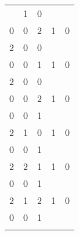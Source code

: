 \documentclass[11pt]{article} \usepackage{amssymb}
\begin{document}
\begin{enumerate}
\begin{enumerate}
\begin{tabular}{l|l|l|l|l}
\begin{pmatrix}
            1&1  &0 \\ 
            0&0  &2 
          \end{pmatrix}$
          & $(x^2+2x+2)(x+1)$ & 8 & 702&16\\
        \end{tabular}
        \begin{tabular}{l|l|l|l|l}
        Representative& Characteristic Polynomial& Element Order& Class Size& Centralizer Size\\
        \hline
          $\begin{pmatrix}
            0&1  &0 \\ 
            2&0  &0 \\ 
            0&0  &1 
          \end{pmatrix}$
          & $(x^2+1)(x+2)$ & 4 & 702&16\\
        \hline
          $\begin{pmatrix}
            0&1  &0 \\ 
            2&0  &0 \\ 
            0&0  &2 
          \end{pmatrix}$
          & $(x^2+1)(x+1)$ & 4 & 702&16\\
        \hline
          $\begin{pmatrix}
            0&1  &0 \\ 
            0&0  &1 \\ 
            2&1  &0 
          \end{pmatrix}$
          & $x^3+2x+1$ & 26 & 432&26\\
        \hline
          $\begin{pmatrix}
            0&1  &0 \\ 
            0&0  &1 \\ 
            2&2  &1 
          \end{pmatrix}$
          & $x^3+2x^2+x+1$ & 26 & 432&26\\
        \hline
          $\begin{pmatrix}
            0&1  &0 \\ 
            0&0  &1 \\ 
            2&1  &2 
          \end{pmatrix}$
          & $x^3+x^2+2x+1$ & 26 & 432&26\\
        \hline
          $\begin{pmatrix}
            0&1  &0 \\ 
            0&0  &1 \\ 

\end{pmatrix}
\end{tabular}
\end{enumerate}
\end{enumerate}
\end{document}
